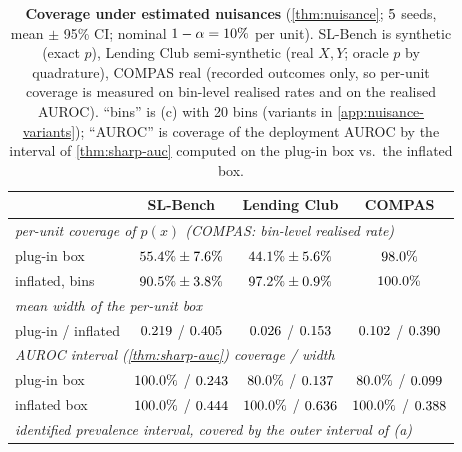 \begin{table}[t]
\centering\small
\caption{\textbf{Coverage under estimated nuisances} (\cref{thm:nuisance};
$5$ seeds, mean $\pm$ 95\% CI; nominal $1-\alpha=10\%$
per unit). SL-Bench is synthetic (exact $p$), Lending Club semi-synthetic
(real $X,Y$; oracle $p$ by quadrature), COMPAS real (recorded outcomes only, so
per-unit coverage is measured on bin-level realised rates and on the realised
AUROC). ``bins'' is (c) with 20 bins (variants in
\cref{app:nuisance-variants}); ``AUROC'' is coverage of the deployment AUROC by the interval
of \cref{thm:sharp-auc} computed on the plug-in box vs.\ the inflated box.}
\label{tab:nuisance}
\begin{tabular}{lccc}
\toprule
 & SL-Bench & Lending Club & COMPAS\\
\midrule
\multicolumn{4}{l}{\emph{per-unit coverage of $p(x)$ (COMPAS: bin-level realised rate)}}\\
plug-in box            & $55.4\%\pm7.6\%$ & $44.1\%\pm5.6\%$ & $98.0\%$\\
inflated, bins         & $90.5\%\pm3.8\%$ & $97.2\%\pm0.9\%$ & $100.0\%$\\
\midrule
\multicolumn{4}{l}{\emph{mean width of the per-unit box}}\\
plug-in / inflated     & $0.219$ / $0.405$ & $0.026$ / $0.153$ & $0.102$ / $0.390$\\
\midrule
\multicolumn{4}{l}{\emph{AUROC interval (\cref{thm:sharp-auc}) coverage / width}}\\
plug-in box            & $100.0\%$ / $0.243$ & $80.0\%$ / $0.137$ & $80.0\%$ / $0.099$\\
inflated box           & $100.0\%$ / $0.444$ & $100.0\%$ / $0.636$ & $100.0\%$ / $0.388$\\
\midrule
\multicolumn{4}{l}{\emph{identified prevalence interval, covered by the outer interval of (a)}}\\

\end{tabular}
\end{table}
